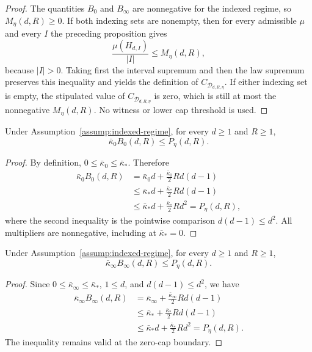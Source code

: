 \begin{proof}
The quantities $B_0$ and $B_\infty$ are nonnegative for the indexed regime,
so $M_\eta(d,R)\geq0$.  If both indexing sets are nonempty, then for every
admissible $\mu$ and every $I$ the preceding proposition gives
\[
\frac{\mu(H_{d,I})}{|I|}\leq M_\eta(d,R),
\]
because $|I|>0$.  Taking first the interval supremum and then the law
supremum preserves this inequality and yields the definition of
$C_{\mathcal D_{d,R,\eta}}$.  If either indexing set is empty, the stipulated
value of $C_{\mathcal D_{d,R,\eta}}$ is zero, which is still at most the
nonnegative $M_\eta(d,R)$.  No witness or lower cap threshold is used.
\end{proof}

\begin{lemma}
\label{lem:inner-polynomial-domination}
Under Assumption~\ref{assump:indexed-regime}, for every $d\geq1$ and $R\geq1$,
\[
\bar\kappa_0B_0(d,R)\leq P_\eta(d,R).
\]
\end{lemma}

\begin{proof}
By definition, $0\leq\bar\kappa_0\leq\bar\kappa_*$.  Therefore
\[
\begin{aligned}
\bar\kappa_0B_0(d,R)
&=\bar\kappa_0d+\frac{\bar\kappa_0}{2}Rd(d-1)\\
&\leq\bar\kappa_*d+\frac{\bar\kappa_*}{2}Rd(d-1)\\
&\leq\bar\kappa_*d+\frac{\bar\kappa_*}{2}Rd^2
=P_\eta(d,R),
\end{aligned}
\]
where the second inequality is the pointwise comparison
$d(d-1)\leq d^2$.  All multipliers are nonnegative, including at
$\bar\kappa_*=0$.
\end{proof}

\begin{lemma}
\label{lem:outer-polynomial-domination}
Under Assumption~\ref{assump:indexed-regime}, for every $d\geq1$ and $R\geq1$,
\[
\bar\kappa_\infty B_\infty(d,R)\leq P_\eta(d,R).
\]
\end{lemma}

\begin{proof}
Since $0\leq\bar\kappa_\infty\leq\bar\kappa_*$, $1\leq d$, and
$d(d-1)\leq d^2$, we have
\[
\begin{aligned}
\bar\kappa_\infty B_\infty(d,R)
&=\bar\kappa_\infty+\frac{\bar\kappa_\infty}{2}Rd(d-1)\\
&\leq\bar\kappa_*+\frac{\bar\kappa_*}{2}Rd(d-1)\\
&\leq\bar\kappa_*d+\frac{\bar\kappa_*}{2}Rd^2
=P_\eta(d,R).
\end{aligned}
\]
The inequality remains valid at the zero-cap boundary.
\end{proof}

